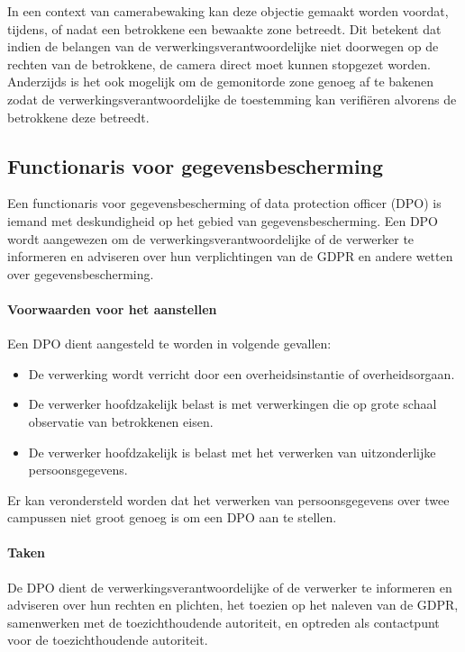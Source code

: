 In een context van camerabewaking kan deze objectie gemaakt worden voordat, tijdens, of nadat een betrokkene een bewaakte zone betreedt. Dit betekent dat indien de belangen van de verwerkingsverantwoordelijke niet doorwegen op de rechten van de betrokkene, de camera direct moet kunnen stopgezet worden. Anderzijds is het ook mogelijk om de gemonitorde zone genoeg af te bakenen zodat de verwerkingsverantwoordelijke de toestemming kan verifiëren alvorens de betrokkene deze betreedt. \autocite{edpb2019guidelines}


\subsection{Functionaris voor gegevensbescherming}
Een functionaris voor gegevensbescherming of data protection officer (DPO) is iemand met deskundigheid op het gebied van gegevensbescherming. Een DPO wordt aangewezen om de verwerkingsverantwoordelijke of de verwerker te informeren en adviseren over hun verplichtingen van de GDPR en andere wetten over gegevensbescherming.

\paragraph{Voorwaarden voor het aanstellen}
Een DPO dient aangesteld te worden in volgende gevallen:
\begin{itemize}
	\item De verwerking wordt verricht door een overheidsinstantie of overheidsorgaan.
	\item De verwerker hoofdzakelijk belast is met verwerkingen die op grote schaal observatie van betrokkenen eisen.
	\item De verwerker hoofdzakelijk is belast met het verwerken van uitzonderlijke persoonsgegevens.
\end{itemize}

Er kan verondersteld worden dat het verwerken van persoonsgegevens over twee campussen niet groot genoeg is om een DPO aan te stellen.

\paragraph{Taken}
De DPO dient de verwerkingsverantwoordelijke of de verwerker te informeren en adviseren over hun rechten en plichten, het toezien op het naleven van de GDPR, samenwerken met de toezichthoudende autoriteit, en optreden als contactpunt voor de toezichthoudende autoriteit.


